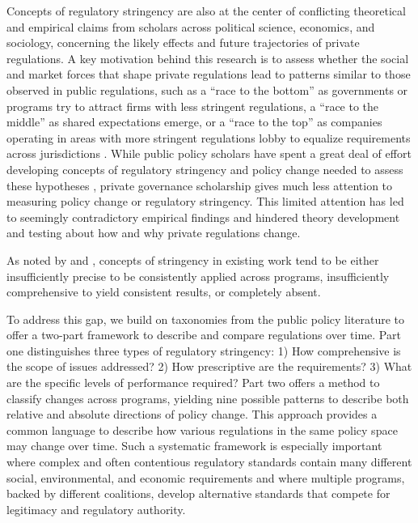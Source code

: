 \documentclass[
      12pt,
            Review ]{article}
\begin{document}
Concepts of regulatory stringency are also at the center of conflicting theoretical and empirical claims from scholars across political science, economics, and sociology, concerning the likely effects and future trajectories of private regulations. A key motivation behind this research is to assess whether the social and market forces that shape private regulations lead to patterns similar to those observed in public regulations, such as a ``race to the bottom'' as governments or programs try to attract firms with less stringent regulations, a ``race to the middle'' as shared expectations emerge, or a ``race to the top'' as companies operating in areas with more stringent regulations lobby to equalize requirements across jurisdictions \citep{Berger1996, Vogel1995}. While public policy scholars have spent a great deal of effort developing concepts of regulatory stringency and policy change needed to assess these hypotheses \citep{Green-Pedersen2007, Hall1993, Howlett2014}, private governance scholarship gives much less attention to measuring policy change or regulatory stringency. This limited attention has led to seemingly contradictory empirical findings and hindered theory development and testing about how and why private regulations change.

As noted by \citet{Brunel2016} and \citet{Howlett2007}, concepts of stringency in existing work tend to be either insufficiently precise to be consistently applied across programs, insufficiently comprehensive to yield consistent results, or completely absent.

To address this gap, we build on taxonomies from the public policy literature to offer a two-part framework to describe and compare regulations over time. Part one distinguishes three types of regulatory stringency: 1) How comprehensive is the scope of issues addressed? 2) How prescriptive are the requirements? 3) What are the specific levels of performance required? Part two offers a method to classify changes across programs, yielding nine possible patterns to describe both relative and absolute directions of policy change. This approach provides a common language to describe how various regulations in the same policy space may change over time. Such a systematic framework is especially important where complex and often contentious regulatory standards contain many different social, environmental, and economic requirements and where multiple programs, backed by different coalitions, develop alternative standards that compete for legitimacy and regulatory authority.
\end{document}

